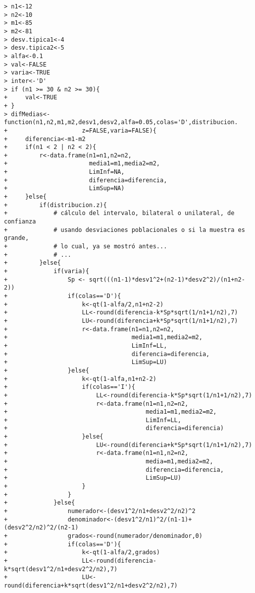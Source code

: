 \begin{solucion}
 \begin{verbatim}
> n1<-12
> n2<-10
> m1<-85
> m2<-81
> desv.tipica1<-4
> desv.tipica2<-5
> alfa<-0.1
> val<-FALSE
> varia<-TRUE
> inter<-'D'
> if (n1 >= 30 & n2 >= 30){
+     val<-TRUE
+ }
> difMedias<-function(n1,n2,m1,m2,desv1,desv2,alfa=0.05,colas='D',distribucion.
+                     z=FALSE,varia=FALSE){
+     diferencia<-m1-m2
+     if(n1 < 2 | n2 < 2){
+         r<-data.frame(n1=n1,n2=n2,
+                       media1=m1,media2=m2,
+                       LimInf=NA,
+                       diferencia=diferencia,
+                       LimSup=NA)
+     }else{
+         if(distribucion.z){
+             # cálculo del intervalo, bilateral o unilateral, de confianza
+             # usando desviaciones poblacionales o si la muestra es grande, 
+             # lo cual, ya se mostró antes...
+             # ...
+         }else{
+             if(varia){
+                 Sp <- sqrt(((n1-1)*desv1^2+(n2-1)*desv2^2)/(n1+n2-2))
+                 if(colas=='D'){
+                     k<-qt(1-alfa/2,n1+n2-2)
+                     LL<-round(diferencia-k*Sp*sqrt(1/n1+1/n2),7)
+                     LU<-round(diferencia+k*Sp*sqrt(1/n1+1/n2),7)
+                     r<-data.frame(n1=n1,n2=n2,
+                                   media1=m1,media2=m2,
+                                   LimInf=LL,
+                                   diferencia=diferencia,
+                                   LimSup=LU)
+                 }else{
+                     k<-qt(1-alfa,n1+n2-2)
+                     if(colas=='I'){
+                         LL<-round(diferencia-k*Sp*sqrt(1/n1+1/n2),7)
+                         r<-data.frame(n1=n1,n2=n2,
+                                       media1=m1,media2=m2,
+                                       LimInf=LL,
+                                       diferencia=diferencia)
+                     }else{
+                         LU<-round(diferencia+k*Sp*sqrt(1/n1+1/n2),7)
+                         r<-data.frame(n1=n1,n2=n2,
+                                       media=m1,media2=m2,
+                                       diferencia=diferencia,
+                                       LimSup=LU)
+                     }
+                 }
+             }else{
+                 numerador<-(desv1^2/n1+desv2^2/n2)^2
+                 denominador<-(desv1^2/n1)^2/(n1-1)+(desv2^2/n2)^2/(n2-1)
+                 grados<-round(numerador/denominador,0)
+                 if(colas=='D'){
+                     k<-qt(1-alfa/2,grados)
+                     LL<-round(diferencia-k*sqrt(desv1^2/n1+desv2^2/n2),7)
+                     LU<-round(diferencia+k*sqrt(desv1^2/n1+desv2^2/n2),7)

\end{verbatim}
\end{solucion}

